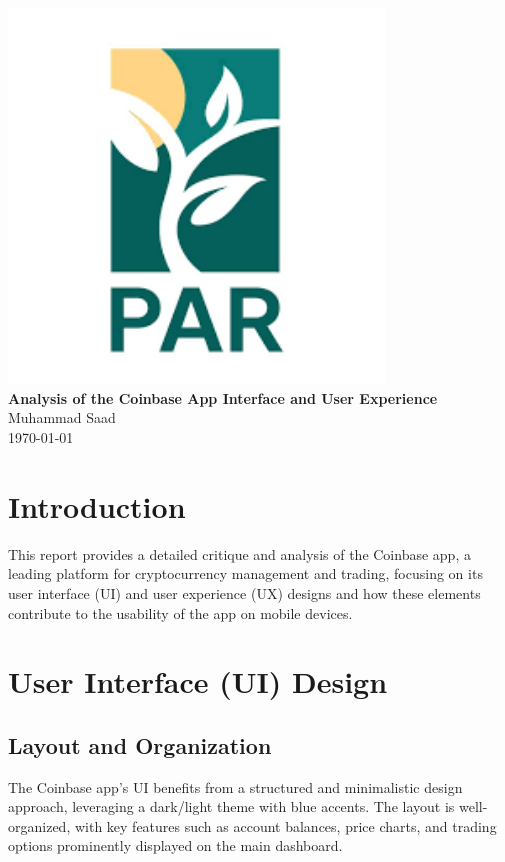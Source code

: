 \documentclass[12pt]{article}
\begin{document}
\begin{titlepage}
    \centering
    \vspace*{\fill} 
    \includegraphics[width=10cm]{img/logo2.png}\\[1cm]
    {\Large \textbf{Analysis of the Coinbase App Interface and User Experience}}\\[0.5cm]
    {\large Muhammad Saad}\\[0.2cm]
    {\large \today}\\[0.5cm]
    \vspace*{\fill}
\end{titlepage}

\newpage

\section{Introduction}
This report provides a detailed critique and analysis of the Coinbase app, a leading platform for cryptocurrency management and trading, focusing on its user interface (UI) and user experience (UX) designs and how these elements contribute to the usability of the app on mobile devices.

\section{User Interface (UI) Design}

\subsection{Layout and Organization}
The Coinbase app's UI benefits from a structured and minimalistic design approach, leveraging a dark/light theme with blue accents. The layout is well-organized, with key features such as account balances, price charts, and trading options prominently displayed on the main dashboard.
\end{document}
